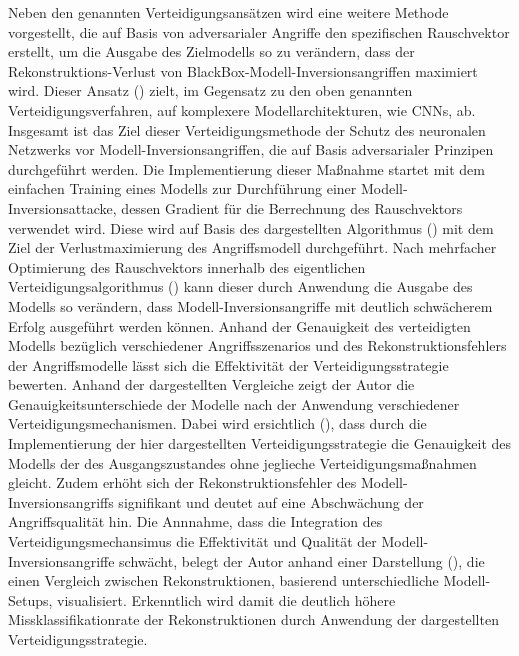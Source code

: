 Neben den genannten Verteidigungsansätzen wird eine weitere Methode vorgestellt, die auf Basis von \glqq adversarialer Angriffe\grqq{} den spezifischen Rauschvektor erstellt, um die Ausgabe des Zielmodells so zu verändern, dass der Rekonstruktions-Verlust von BlackBox-Modell-Inversionsangriffen maximiert wird. Dieser Ansatz (\cite{wen_defending_2021}) zielt, im Gegensatz zu den oben genannten Verteidigungsverfahren, auf komplexere Modellarchitekturen, wie CNNs, ab. Insgesamt ist das Ziel dieser Verteidigungsmethode der Schutz des neuronalen Netzwerks vor Modell-Inversionsangriffen, die auf Basis adversarialer Prinzipen durchgeführt werden. Die Implementierung dieser Maßnahme startet mit dem einfachen Training eines Modells zur Durchführung einer Modell-Inversionsattacke, dessen Gradient für die Berrechnung des Rauschvektors verwendet wird. Diese wird auf Basis des dargestellten Algorithmus (\cite[S. 4, Algorithm 1]{wen_defending_2021}) mit dem Ziel der Verlustmaximierung des Angriffsmodell durchgeführt. Nach mehrfacher Optimierung des Rauschvektors innerhalb des eigentlichen Verteidigungsalgorithmus (\cite[S. 4, Algorithm 2]{wen_defending_2021}) kann dieser durch Anwendung die Ausgabe des Modells so verändern, dass Modell-Inversionsangriffe mit deutlich schwächerem Erfolg ausgeführt werden können. Anhand der Genauigkeit des \glqq verteidigten\grqq{} Modells bezüglich verschiedener Angriffsszenarios und des Rekonstruktionsfehlers der Angriffsmodelle lässt sich die Effektivität der Verteidigungsstrategie bewerten. Anhand der dargestellten Vergleiche zeigt der Autor die Genauigkeitsunterschiede der Modelle nach der Anwendung verschiedener Verteidigungsmechanismen. Dabei wird ersichtlich (\cite[S. 5, Table 1]{wen_defending_2021}), dass durch die Implementierung der hier dargestellten Verteidigungsstrategie die Genauigkeit des Modells der des Ausgangszustandes ohne jeglieche Verteidigungsmaßnahmen gleicht. Zudem erhöht sich der Rekonstruktionsfehler des Modell-Inversionsangriffs signifikant und deutet auf eine Abschwächung der Angriffsqualität hin. Die Annnahme, dass die Integration des Verteidigungsmechansimus die Effektivität und Qualität der Modell-Inversionsangriffe schwächt, belegt der Autor anhand einer Darstellung (\cite[S. 5, Fig. 1]{wen_defending_2021}), die einen Vergleich zwischen Rekonstruktionen, basierend unterschiedliche Modell-Setups, visualisiert. Erkenntlich wird damit die deutlich höhere Missklassifikationrate der Rekonstruktionen durch Anwendung der dargestellten Verteidigungsstrategie.
